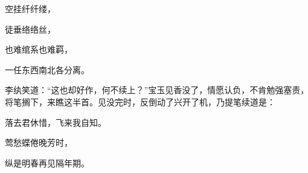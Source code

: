 \begin{poem}

    \begin{pl}

        空挂纤纤缕，
    \end{pl}
    \begin{pl}

        徒垂络络丝，
    \end{pl}
    \begin{pl}

        也难绾系也难羁，
    \end{pl}
    \begin{pl}

        一任东西南北各分离。
    \end{pl}
\end{poem}


\begin{parag}
    李纨笑道：“这也却好作，何不续上？”宝玉见香没了，情愿认负，不肯勉强塞责，将笔搁下，来瞧这半首。见没完时，反倒动了兴开了机，乃提笔续道是：
\end{parag}


\begin{poem}

    \begin{pl}

        落去君休惜，飞来我自知。
    \end{pl}
    \begin{pl}

        莺愁蝶倦晚芳时，
    \end{pl}
    \begin{pl}

        纵是明春再见隔年期。
    \end{pl}
\end{poem}


